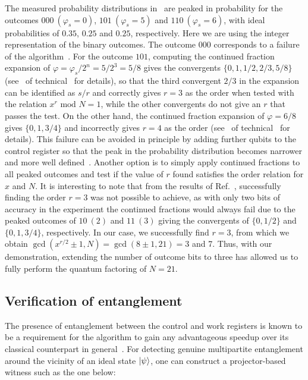 The measured probability distributions in~ are peaked in probability for the outcomes $000~(\varphi_s=0)$, $101~(\varphi_s=5)$ and $110~(\varphi_s=6)$, with ideal probabilities of $0.35$, $0.25$ and $0.25$, respectively. Here we are using the integer representation of the binary outcomes. The outcome $000$ corresponds to a failure of the algorithm~\cite{Lopez_2012}. For the outcome $101$, computing the continued fraction expansion of $\varphi=\varphi_s/2^n=5/2^3=5/8$ gives the convergents $\{0, 1, 1/2, 2/3, 5/8\}$ (see~ of  technical~ for details), so that the third convergent $2/3$ in the expansion can be identified as $s/r$ and correctly gives $r=3$ as the order when tested with the relation $x^r \text{ mod } N=1$, while the other convergents do not give an $r$ that passes the test. On the other hand, the continued fraction expansion of $\varphi=6/8$ gives $\{0, 1, 3/4\}$ and incorrectly gives $r=4$ as the order (see~ of technical~ for details). This failure can be avoided in principle by adding further qubits to the control register so that the peak in the probability distribution becomes narrower and more well defined~\cite{Lopez_2012}. Another option is to simply apply continued fractions to all peaked outcomes and test if the value of $r$ found satisfies the order relation for $x$ and $N$. It is interesting to note that from the results of Ref.~\cite{Lopez_2012}, successfully finding the order $r=3$ was not possible to achieve, as with only two bits of accuracy in the experiment the continued fractions would always fail due to the peaked outcomes of $10~(2)$ and $11~(3)$ giving the convergents of $\{0,1/2\}$ and $\{0,1,3/4\}$, respectively. In our case, we successfully find $r=3$, from which we obtain $\gcd(x^{r/2}\pm1,N)=\gcd(8\pm1,21)=3$ and 7. Thus, with our demonstration, extending the number of outcome bits to three has allowed us to fully perform the quantum factoring of $N=21$.



\clearpage
\subsection{Verification of entanglement}

The presence of entanglement between the control and work registers is known to be a requirement for the algorithm to gain any advantageous speedup over its classical counterpart in general~\cite{Vidal_2003a, Braunstein_1999, Jozsa_2003}. For detecting genuine multipartite entanglement around the vicinity of an ideal state $\ket{\psi}$, one can construct a projector-based witness such as the one below:

